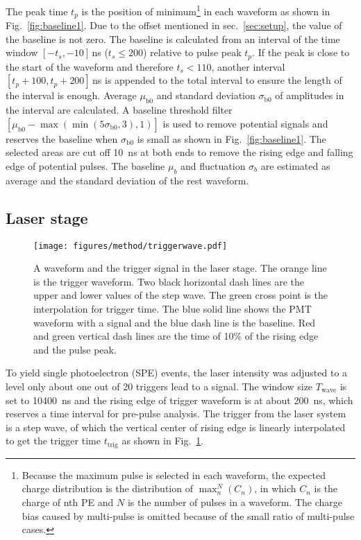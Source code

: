 The peak time $t_p$ is the position of minimum\footnote{Because the maximum pulse is selected in each waveform, the expected charge distribution is the distribution of $\max_n^N(C_n)$, in which $C_n$ is the charge of nth PE and $N$ is the number of pulses in a waveform. The charge bias caused by multi-pulse is omitted because of the small ratio of multi-pulse cases.} in each waveform as shown in Fig.~\ref{fig:baseline1}. Due to the offset mentioned in sec.~\ref{sec:setup}, the value of the baseline is not zero. The baseline is calculated from an interval of the time window $[-t_s,-10]$\,ns ($t_s\leq200$) relative to pulse peak $t_p$. If the peak is close to the start of the waveform and therefore $t_s < 110$, another interval $[t_p+100,t_p+200]$\,ns is appended to the total interval to ensure the length of the interval is enough. Average $\mu_{\mathrm{b0}}$ and standard deviation $\sigma_{\mathrm{b0}}$ of amplitudes in the interval are calculated. A baseline threshold filter $[\mu_{\mathrm{b0}}-\max(\min(5\sigma_{\mathrm{b0}},3),1)]$ is used to remove potential signals and reserves the baseline when $\sigma_{\mathrm{b0}}$ is small as shown in Fig.~\ref{fig:baseline1}. The selected areas are cut off \SI{10}{ns} at both ends to remove the rising edge and falling edge of potential pulses. The baseline $\mu_b$ and fluctuation $\sigma_b$ are estimated as average and the standard deviation of the rest waveform.

\subsection{Laser stage}
\label{sec:laserstage}

\begin{figure}[!htbp]
    \centering
    \texttt{[image: figures/method/triggerwave.pdf]}
    \caption{A waveform and the trigger signal in the laser stage. The orange line is the trigger waveform. Two black horizontal dash lines are the upper and lower values of the step wave. The green cross point is the interpolation for trigger time. The blue solid line shows the PMT waveform with a signal and the blue dash line is the baseline. Red and green vertical dash lines are the time of 10\% of the rising edge and the pulse peak.}
    \label{fig:triggertime}
\end{figure}

To yield single photoelectron (SPE) events, the laser intensity was adjusted to a level only about one out of 20 triggers lead to a signal. The window size $T_{\mathrm{wave}}$ is set to \SI{10400}{ns} and the rising edge of trigger waveform is at about \SI{200}{ns}, which reserves a time interval for pre-pulse analysis. The trigger from the laser system is a step wave, of which the vertical center of rising edge is linearly interpolated to get the trigger time $t_{\mathrm{trig}}$ as shown in Fig.~\ref{fig:triggertime}.

